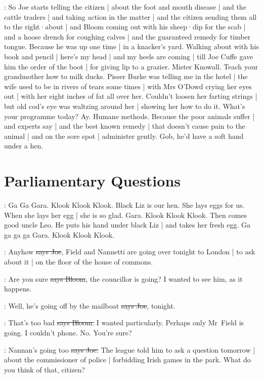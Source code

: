 \Nq:
So Joe starts telling the citizen |
about the foot and mouth disease |
and the cattle traders |
and taking action in the matter |
and the citizen sending them all to the right·about |
and Bloom coming out with his sheep·dip for the scab |
and a hoose drench for coughing calves |
and the guaranteed remedy for timber tongue.
Because he was up one time |
in a knacker's yard.
Walking about with his book and pencil |
here's my head |
and my heels are coming |
till Joe Cuffe gave him the order of the boot |
for giving lip to a grazier.
Mister Knowall.
Teach your grandmother how to milk ducks.
Pisser Burke was telling me in the hotel  |
the wife used to be in rivers of tears some times |
with Mrs O'Dowd crying her eyes out
 |
with her eight inches of fat all over her.
Couldn't loosen her farting strings |
but old cod's eye was waltzing around her |
showing her how to do it.
What's your programme today?
Ay.
Humane methods.
Because the poor animals suffer |
and experts say |
and the best known remedy |
that doesn't cause pain to the animal |
and on the sore spot |
administer gently.
Gob,
he'd have a soft hand under a hen.


\section{Parliamentary Questions}

:
Ga Ga Gara.
Klook Klook Klook.
Black Liz is our hen.
She lays eggs for us.
When she lays her egg |
she is so glad.
Gara.
Klook Klook Klook.
Then comes good uncle Leo.
He puts his hand under black Liz |
and takes her fresh egg.
Ga ga ga ga Gara.
Klook Klook Klook.

\joe:
Anyhow
\sout{says Joe},
Field and Nannetti are going over tonight to London
 |
to ask about it |
on the floor of the house of commons.

\Bloom:
Are you sure
\sout{says Bloom},
the councillor is going?
I wanted to see him,
as it happens.

\joe:
Well,
he's going off by the mailboat
\sout{says Joe},
tonight.

\Bloom:
That's too bad
\sout{says Bloom.}
I wanted particularly.
Perhaps only Mr~Field is going.
I couldn't phone.
No.
You're sure?

\joe:
Nannan's going too
\sout{says Joe.}
The league told him to ask a question tomorrow |
about the commissioner of police |
forbidding Irish games in the park.
What do you think of that,
citizen?


